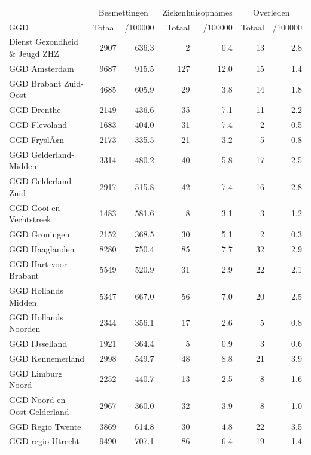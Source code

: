 \documentclass[
  english,
  man,floatsintext]{apa6}
\begin{document}
\begin{table}[H]
\centering\begingroup\fontsize{10}{12}\selectfont

\begin{threeparttable}
\begin{tabular}{lrrrrrr}
\toprule
\multicolumn{1}{c}{ } & \multicolumn{2}{c}{Besmettingen} & \multicolumn{2}{c}{Ziekenhuisopnames} & \multicolumn{2}{c}{Overleden} \\
\cmidrule(l{3pt}r{3pt}){2-3} \cmidrule(l{3pt}r{3pt}){4-5} \cmidrule(l{3pt}r{3pt}){6-7}
GGD & Totaal & /100000 & Totaal & /100000 & Totaal & /100000\\
\midrule
Dienst Gezondheid \& Jeugd ZHZ & 2907 & 636.3 & 2 & 0.4 & 13 & 2.8\\
GGD Amsterdam & 9687 & 915.5 & 127 & 12.0 & 15 & 1.4\\
GGD Brabant Zuid-Oost & 4685 & 605.9 & 29 & 3.8 & 14 & 1.8\\
GGD Drenthe & 2149 & 436.6 & 35 & 7.1 & 11 & 2.2\\
GGD Flevoland & 1683 & 404.0 & 31 & 7.4 & 2 & 0.5\\
GGD FryslÃ¢n & 2173 & 335.5 & 21 & 3.2 & 5 & 0.8\\
GGD Gelderland-Midden & 3314 & 480.2 & 40 & 5.8 & 17 & 2.5\\
GGD Gelderland-Zuid & 2917 & 515.8 & 42 & 7.4 & 16 & 2.8\\
GGD Gooi en Vechtstreek & 1483 & 581.6 & 8 & 3.1 & 3 & 1.2\\
GGD Groningen & 2152 & 368.5 & 30 & 5.1 & 2 & 0.3\\
GGD Haaglanden & 8280 & 750.4 & 85 & 7.7 & 32 & 2.9\\
GGD Hart voor Brabant & 5549 & 520.9 & 31 & 2.9 & 22 & 2.1\\
GGD Hollands Midden & 5347 & 667.0 & 56 & 7.0 & 20 & 2.5\\
GGD Hollands Noorden & 2344 & 356.1 & 17 & 2.6 & 5 & 0.8\\
GGD IJsselland & 1921 & 364.4 & 5 & 0.9 & 3 & 0.6\\
GGD Kennemerland & 2998 & 549.7 & 48 & 8.8 & 21 & 3.9\\
GGD Limburg Noord & 2252 & 440.7 & 13 & 2.5 & 8 & 1.6\\
GGD Noord en Oost Gelderland & 2967 & 360.0 & 32 & 3.9 & 8 & 1.0\\
GGD Regio Twente & 3869 & 614.8 & 30 & 4.8 & 22 & 3.5\\
GGD regio Utrecht & 9490 & 707.1 & 86 & 6.4 & 19 & 1.4\\

\end{tabular}
\end{threeparttable}
\end{table}
\end{document}
